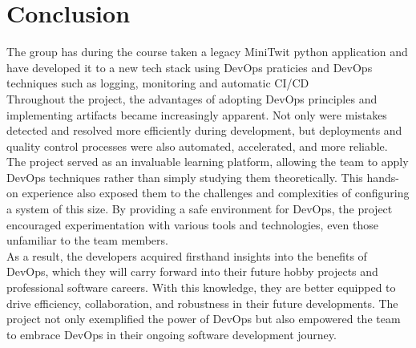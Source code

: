\section{Conclusion}
The group has during the course taken a legacy MiniTwit python application and have developed it to a new tech stack using DevOps praticies and DevOps techniques such as logging, monitoring and automatic CI/CD \\

Throughout the project, the advantages of adopting DevOps principles and implementing artifacts became increasingly apparent. Not only were mistakes detected and resolved more efficiently during development, but deployments and quality control processes were also automated, accelerated, and more reliable. \\

The project served as an invaluable learning platform, allowing the team to apply DevOps techniques rather than simply studying them theoretically. This hands-on experience also exposed them to the challenges and complexities of configuring a system of this size. By providing a safe environment for DevOps, the project encouraged experimentation with various tools and technologies, even those unfamiliar to the team members. \\

As a result, the developers acquired firsthand insights into the benefits of DevOps, which they will carry forward into their future hobby projects and professional software careers. With this knowledge, they are better equipped to drive efficiency, collaboration, and robustness in their future developments. The project not only exemplified the power of DevOps but also empowered the team to embrace DevOps in their ongoing software development journey.